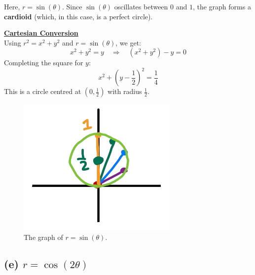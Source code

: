 \documentclass{article}
\begin{document}
\begin{solutionbox}
Here, \( r = \sin(\theta) \). Since \( \sin(\theta) \) oscillates between \( 0 \) and \( 1 \), the graph forms a \textbf{cardioid} (which, in this case, is a perfect circle).

\begin{conceptbox}
    \textbf{\underline{Cartesian Conversion}} \\ 
    Using \( r^2 = x^2 + y^2 \) and \( r = \sin(\theta) \), we get:
    \[
    x^2 + y^2 = y \quad \Rightarrow \quad \left(x^2 + y^2\right) - y = 0
    \]
    Completing the square for \( y \):
    \[
    x^2 + \left(y - \frac{1}{2}\right)^2 = \frac{1}{4}
    \]
    This is a circle centred at \( (0, \frac{1}{2}) \) with radius \( \frac{1}{2} \).
\end{conceptbox}
\begin{figure}[H]
    \centering
    \includegraphics[width=0.7\textwidth]{polar curve sketch d.png}
    \caption{The graph of \( r = \sin(\theta) \).}
    \label{fig:cardioid_graph}
\end{figure}
\end{solutionbox}

\subsection*{(e) \( r = \cos(2\theta) \)}
\end{document}

